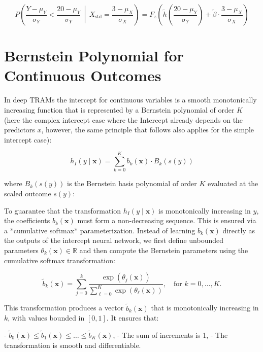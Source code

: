 \[
P\left(\frac{Y - \mu_Y}{\sigma_Y} < \frac{20 - \mu_Y}{\sigma_Y} \,\middle|\, X_{\text{std}} = \frac{3 - \mu_X}{\sigma_X} \right)
= F_z\left(\tilde{h}\left(\frac{20 - \mu_Y}{\sigma_Y}\right) + \tilde{\beta} \cdot \frac{3 - \mu_X}{\sigma_X} \right)
\]


\section{Bernstein Polynomial for Continuous Outcomes}

In deep TRAMs the intercept for continuous variables is a smooth monotonically increasing function that is represented by a Bernstein polynomial of order \( K \) (here the complex intercept case where the Intercept already depends on the predictors $x$, however, the same principle that follows also applies for the simple intercept case):

\begin{equation}
h_I(y \mid \mathbf{x}) = \sum_{k=0}^{K} b_k(\mathbf{x}) \cdot B_k(s(y))
\label{eq:bernstein_intercept}
\end{equation}

where \( B_k(s(y)) \) is the Bernstein basis polynomial of order \( K \) evaluated at the scaled outcome \( s(y) \):


To guarantee that the transformation \( h_I(y \mid \mathbf{x}) \) is monotonically increasing in \( y \), the coefficients \( b_k(\mathbf{x}) \) must form a non-decreasing sequence. This is ensured via a *cumulative softmax* parameterization. Instead of learning \( b_k(\mathbf{x}) \) directly as the outputs of the intercept neural network, we first define unbounded parameters \( \theta_k(\mathbf{x}) \in \mathbb{R} \) and then compute the Bernstein parameters using the cumulative softmax transformation:

\begin{equation}
\tilde{b}_k(\mathbf{x}) = \sum_{j=0}^{k} \frac{\exp(\theta_j(\mathbf{x}))}{\sum_{\ell=0}^{K} \exp(\theta_\ell(\mathbf{x}))}, \quad \text{for } k = 0, \ldots, K.
\end{equation}

This transformation produces a vector \( \tilde{b}_k(\mathbf{x}) \) that is monotonically increasing in \( k \), with values bounded in \( [0, 1] \). It ensures that:

- \( \tilde{b}_0(\mathbf{x}) \leq \tilde{b}_1(\mathbf{x}) \leq \ldots \leq \tilde{b}_K(\mathbf{x}) \),
- The sum of increments is 1,
- The transformation is smooth and differentiable.


